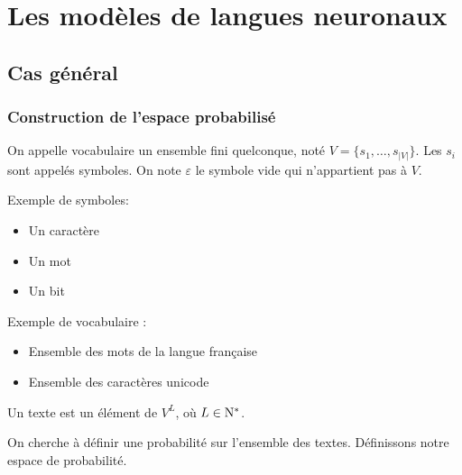 

\title{}
\author{Etienne Boisseau, Olivier Dulcy, Christos Katsoulakis, Eric Lavergne}
\date{}

\pagestyle{theme}



\tableofcontents

\section{Les modèles de langues neuronaux}

\subsection{Cas général}

\subsubsection{Construction de l'espace probabilisé}


\begin{definition}
  On appelle vocabulaire un ensemble fini quelconque, noté $V = \{ s_1, \ldots, s_{\vert V \vert} \}$. Les $s_i$ sont appelés symboles.
  On note $\varepsilon$ le symbole vide qui n'appartient pas à $V$.
\end{definition}

Exemple de symboles:
\begin{itemize}
\item Un caractère
\item Un mot
\item Un bit
\end{itemize}

Exemple de vocabulaire :
  \begin{itemize}
      \item Ensemble des mots de la langue française
      \item Ensemble des caractères unicode
  \end{itemize}

\begin{definition}
Un texte est un élément de $V^L$, où $L \in \mathrm{N}^*$.
\end{definition}

On cherche à définir une probabilité sur l'ensemble des textes. Définissons notre espace de probabilité.

